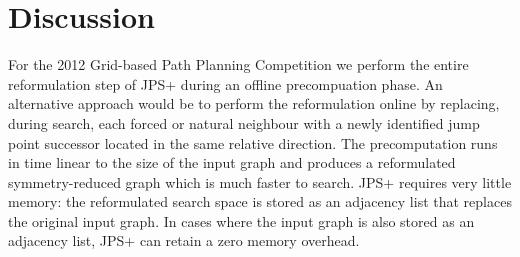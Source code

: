 \section{Discussion}
For the 2012 Grid-based Path Planning Competition we perform the entire 
reformulation step of JPS+ during an offline precompuation phase. 
An alternative approach would be to perform the reformulation online by
replacing, during search, each forced or natural neighbour with a newly
identified jump point successor located in the same relative direction.
The precomputation runs in time linear to the size of the input graph
and produces a reformulated symmetry-reduced graph which is much faster
to search. JPS+ requires very little memory: the reformulated search space
is stored as an adjacency list that replaces the original input graph.
In cases where the input graph is also stored as an adjacency list, JPS+
can retain a zero memory overhead.
